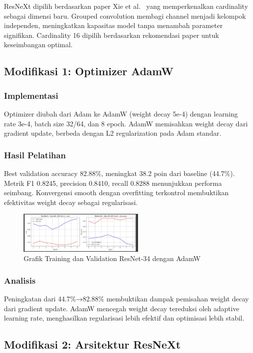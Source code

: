 \documentclass[11pt,a4paper]{article}
\begin{document}
ResNeXt dipilih berdasarkan paper Xie et al.~\cite{xie2017aggregated} yang memperkenalkan cardinality sebagai dimensi baru. Grouped convolution membagi channel menjadi kelompok independen, meningkatkan kapasitas model tanpa menambah parameter signifikan. Cardinality 16 dipilih berdasarkan rekomendasi paper untuk keseimbangan optimal.

\subsection{Modifikasi 1: Optimizer AdamW}
\subsubsection{Implementasi}
Optimizer diubah dari Adam ke AdamW (weight decay 5e-4) dengan learning rate 3e-4, batch size 32/64, dan 8 epoch. AdamW memisahkan weight decay dari gradient update, berbeda dengan L2 regularization pada Adam standar.

\subsubsection{Hasil Pelatihan}
Best validation accuracy 82.88\%, meningkat 38.2 poin dari baseline (44.7\%). Metrik F1 0.8245, precision 0.8410, recall 0.8288 menunjukkan performa seimbang. Konvergensi smooth dengan overfitting terkontrol membuktikan efektivitas weight decay sebagai regularisasi.

\begin{figure}[h]
\centering
\includegraphics[width=0.55\textwidth]{Figure/tahap-3-resnet34-adamw.jpg}
\caption{Grafik Training dan Validation ResNet-34 dengan AdamW}
\label{fig:resnet34-adamw}
\end{figure}

\subsubsection{Analisis}
Peningkatan dari 44.7\%→82.88\% membuktikan dampak pemisahan weight decay dari gradient update. AdamW mencegah weight decay tereduksi oleh adaptive learning rate, menghasilkan regularisasi lebih efektif dan optimisasi lebih stabil.

\subsection{Modifikasi 2: Arsitektur ResNeXt}
\end{document}
